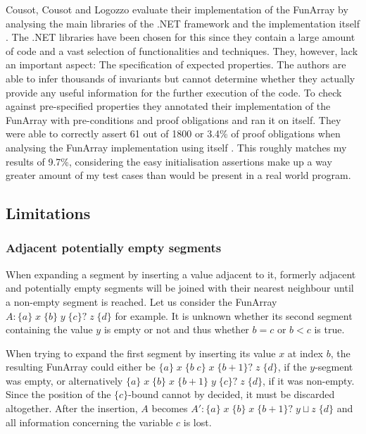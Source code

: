 \documentclass{report}
\newcommand{\funArray}[1]{$#1$}
\newcommand{\bound}[1]{\{#1\}}
\newcommand{\fvalue}[1]{\;#1\;}
\begin{document}
Cousot, Cousot and Logozzo evaluate their implementation of the FunArray by analysing the main libraries of the .NET framework and the implementation itself \cite{cousot2011}. The .NET libraries have been chosen for this since they contain a large amount of code and a vast selection of functionalities and techniques. They, however, lack an important aspect: The specification of expected properties. The authors are able to infer thousands of invariants but cannot determine whether they actually provide any useful information for the further execution of the code. To check against pre-specified properties they annotated their implementation of the FunArray with pre-conditions and proof obligations and ran it on itself. They were able to correctly assert 61 out of 1800 or 3.4\% of proof obligations when analysing the FunArray implementation using itself \cite{cousot2011}. This roughly matches my results of 9.7\%, considering the easy initialisation assertions make up a way greater amount of my test cases than would be present in a real world program.

\subsection{Limitations}

\subsubsection{Adjacent potentially empty segments}
When expanding a segment by inserting a value adjacent to it, formerly adjacent and potentially empty segments will be joined with their nearest neighbour until a non-empty segment is reached. Let us consider the FunArray \funArray{A:\bound{a} \fvalue{x} \bound{b} \fvalue{y} \bound{c}? \fvalue{z} \bound{d}} for example. It is unknown whether its second segment containing the value $y$ is empty or not and thus whether $b=c$ or $b<c$ is true.

When trying to expand the first segment by inserting its value $x$ at index $b$, the resulting FunArray could either be \funArray{\bound{a} \fvalue{x} \bound{b\;c} \fvalue{x} \bound{b+1}? \fvalue{z} \bound{d}}, if the $y$-segment was empty, or alternatively \funArray{\bound{a} \fvalue{x} \bound{b} \fvalue{x} \bound{b+1} \fvalue{y} \bound{c}? \fvalue{z} \bound{d}}, if it was non-empty. Since the position of the \funArray{\bound{c}}-bound cannot by decided, it must be discarded altogether. After the insertion, $A$ becomes \funArray{A':\bound{a} \fvalue{x} \bound{b} \fvalue{x} \bound{b+1}? \fvalue{y\sqcup z} \bound{d}} and all information concerning the variable $c$ is lost.
\end{document}
